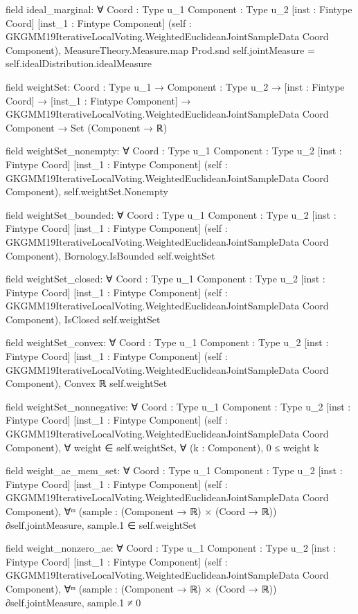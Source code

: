\documentclass[10pt]{article}
\begin{document}
\begin{ReviewVerbatim}
field ideal_marginal:
∀ {Coord : Type u_1} {Component : Type u_2} [inst : Fintype Coord] [inst_1 : Fintype Component]
  (self : GKGMM19IterativeLocalVoting.WeightedEuclideanJointSampleData Coord Component),
  MeasureTheory.Measure.map Prod.snd self.jointMeasure = self.idealDistribution.idealMeasure

field weightSet:
{Coord : Type u_1} →
  {Component : Type u_2} →
    [inst : Fintype Coord] →
      [inst_1 : Fintype Component] →
        GKGMM19IterativeLocalVoting.WeightedEuclideanJointSampleData Coord Component → Set (Component → ℝ)

field weightSet_nonempty:
∀ {Coord : Type u_1} {Component : Type u_2} [inst : Fintype Coord] [inst_1 : Fintype Component]
  (self : GKGMM19IterativeLocalVoting.WeightedEuclideanJointSampleData Coord Component), self.weightSet.Nonempty

field weightSet_bounded:
∀ {Coord : Type u_1} {Component : Type u_2} [inst : Fintype Coord] [inst_1 : Fintype Component]
  (self : GKGMM19IterativeLocalVoting.WeightedEuclideanJointSampleData Coord Component),
  Bornology.IsBounded self.weightSet

field weightSet_closed:
∀ {Coord : Type u_1} {Component : Type u_2} [inst : Fintype Coord] [inst_1 : Fintype Component]
  (self : GKGMM19IterativeLocalVoting.WeightedEuclideanJointSampleData Coord Component), IsClosed self.weightSet

field weightSet_convex:
∀ {Coord : Type u_1} {Component : Type u_2} [inst : Fintype Coord] [inst_1 : Fintype Component]
  (self : GKGMM19IterativeLocalVoting.WeightedEuclideanJointSampleData Coord Component), Convex ℝ self.weightSet

field weightSet_nonnegative:
∀ {Coord : Type u_1} {Component : Type u_2} [inst : Fintype Coord] [inst_1 : Fintype Component]
  (self : GKGMM19IterativeLocalVoting.WeightedEuclideanJointSampleData Coord Component),
  ∀ weight ∈ self.weightSet, ∀ (k : Component), 0 ≤ weight k

field weight_ae_mem_set:
∀ {Coord : Type u_1} {Component : Type u_2} [inst : Fintype Coord] [inst_1 : Fintype Component]
  (self : GKGMM19IterativeLocalVoting.WeightedEuclideanJointSampleData Coord Component),
  ∀ᵐ (sample : (Component → ℝ) × (Coord → ℝ)) ∂self.jointMeasure, sample.1 ∈ self.weightSet

field weight_nonzero_ae:
∀ {Coord : Type u_1} {Component : Type u_2} [inst : Fintype Coord] [inst_1 : Fintype Component]
  (self : GKGMM19IterativeLocalVoting.WeightedEuclideanJointSampleData Coord Component),
  ∀ᵐ (sample : (Component → ℝ) × (Coord → ℝ)) ∂self.jointMeasure, sample.1 ≠ 0


\end{ReviewVerbatim}
\end{document}

